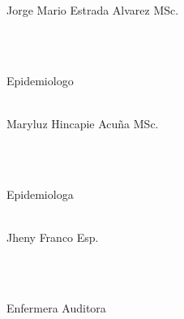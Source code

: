 \begin{titlepage}
\begin{minipage}{0.5\textwidth}
\begin{flushleft}
			Jorge Mario Estrada Alvarez MSc. %
		\end{flushleft}
	\end{minipage}
	~
	\begin{minipage}{0.4\textwidth}
		\begin{flushright}
			\large
			\textit{}\\
			Epidemiologo %
		\end{flushright}
	\end{minipage}

	\begin{minipage}{0.5\textwidth}
		\begin{flushleft}
			\large
			\textit{}\\
			Maryluz Hincapie Acuña MSc. %
		\end{flushleft}
	\end{minipage}
	~
	\begin{minipage}{0.4\textwidth}
		\begin{flushright}
			\large
			\textit{}\\
			Epidemiologa %
		\end{flushright}
	\end{minipage}

	\begin{minipage}{0.5\textwidth}
		\begin{flushleft}
			\large
			\textit{}\\
			Jheny Franco Esp. %
		\end{flushleft}
	\end{minipage}
	~
	\begin{minipage}{0.4\textwidth}
		\begin{flushright}
			\large
			\textit{}\\
			Enfermera Auditora %
		\end{flushright}
	\end{minipage}
	
	
	
	\vfill\vfill\vfill %
	
	
	
\end{titlepage}

